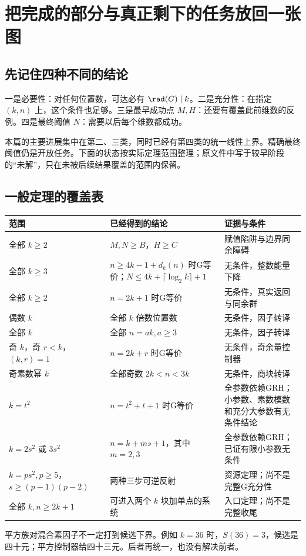 \chapter{把完成的部分与真正剩下的任务放回一张图}\label{ch:map}
\section{先记住四种不同的结论}
一是必要性：对任何位置数，可达必有 $\rad(G)\mid k$。二是充分性：在指定 $(k,n)$ 上，这个条件也足够。三是最早成功点 $M,H$：还要有覆盖此前维数的反例。四是最终阈值 $N$：需要以后每个维数都成功。

本篇的主要进展集中在第二、三类，同时已经有第四类的统一线性上界。精确最终阈值仍是开放任务。下面的状态按实际定理范围整理；原文件中写于较早阶段的“未解”，只在未被后续结果覆盖的范围内保留。

\section{一般定理的覆盖表}
\begin{longtable}{p{}p{}p{}}
\toprule 范围&已经得到的结论&证据与条件\\\midrule\endhead
全部 $k\ge2$&$M,N\ge B$，$H\ge C$&赋值陷阱与边界同余障碍\\
全部 $k\ge3$&$n\ge4k-1+d_k(n)$ 时G等价；$N\le4k+\lceil\log_2k\rceil+1$&无条件，整数能量下降\\
全部 $k\ge2$&$n=2k+1$ 时G等价&无条件，真实返回与同余群\\
偶数 $k$&全部 $k$ 倍数位置数&无条件，因子转译\\
全部 $k$&全部 $n=ak,a\ge3$&无条件，因子转译\\
奇 $k$，奇 $r<k$，$(k,r)=1$&$n=2k+r$ 时G等价&无条件，奇余量控制器\\
奇素数幂 $k$&全部奇数 $2k<n<3k$&无条件，商块转译\\
$k=t^2$&$n=t^2+t+1$ 时G等价&全参数依赖GRH；小参数、素数模数和充分大参数有无条件结论\\
$k=2s^2$ 或 $3s^2$&$n=k+ms+1$，其中 $m=2,3$&全参数依赖GRH；已证有限小参数无条件\\
$k=ps^2,p\ge5$，$s\ge(p-1)(p-2)$&两种三步可逆反射&资源定理；尚不是完整G充分性\\
全部 $k,n\ge2k+1$&可进入两个 $k$ 块加单点的系统&入口定理；尚不是完整收尾\\
\bottomrule
\end{longtable}

平方族对混合素因子不一定打到候选下界。例如 $k=36$ 时，$S(36)=3$，候选是四十元；平方控制器给四十三元。后者再统一，也没有解决前者。

